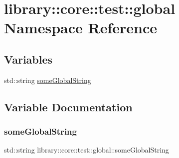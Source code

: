 \hypertarget{namespacelibrary_1_1core_1_1test_1_1global}{}\section{library\+:\+:core\+:\+:test\+:\+:global Namespace Reference}
\label{namespacelibrary_1_1core_1_1test_1_1global}
\subsection*{Variables}
\begin{DoxyCompactItemize}
\item 
std\+::string \hyperlink{namespacelibrary_1_1core_1_1test_1_1global_a907aaffd5b2bd606c175288f10e1e45c}{some\+Global\+String}
\end{DoxyCompactItemize}


\subsection{Variable Documentation}
\mbox{\label{namespacelibrary_1_1core_1_1test_1_1global_a907aaffd5b2bd606c175288f10e1e45c}} 
\subsubsection{\texorpdfstring{some\+Global\+String}{someGlobalString}}
{\footnotesize\ttfamily std\+::string library\+::core\+::test\+::global\+::some\+Global\+String}

